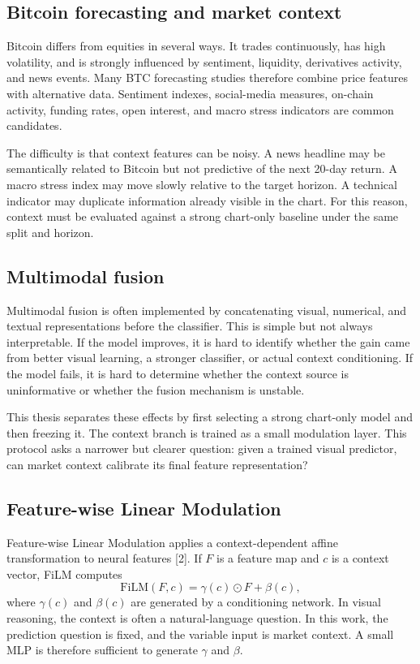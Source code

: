 \documentclass[14pt,a4paper]{extarticle}
\begin{document}
\subsection{Bitcoin forecasting and market context}

Bitcoin differs from equities in several ways. It trades continuously, has high volatility, and is strongly influenced by sentiment, liquidity, derivatives activity, and news events. Many BTC forecasting studies therefore combine price features with alternative data. Sentiment indexes, social-media measures, on-chain activity, funding rates, open interest, and macro stress indicators are common candidates.

The difficulty is that context features can be noisy. A news headline may be semantically related to Bitcoin but not predictive of the next 20-day return. A macro stress index may move slowly relative to the target horizon. A technical indicator may duplicate information already visible in the chart. For this reason, context must be evaluated against a strong chart-only baseline under the same split and horizon.

\subsection{Multimodal fusion}

Multimodal fusion is often implemented by concatenating visual, numerical, and textual representations before the classifier. This is simple but not always interpretable. If the model improves, it is hard to identify whether the gain came from better visual learning, a stronger classifier, or actual context conditioning. If the model fails, it is hard to determine whether the context source is uninformative or whether the fusion mechanism is unstable.

This thesis separates these effects by first selecting a strong chart-only model and then freezing it. The context branch is trained as a small modulation layer. This protocol asks a narrower but clearer question: given a trained visual predictor, can market context calibrate its final feature representation?

\subsection{Feature-wise Linear Modulation}

Feature-wise Linear Modulation applies a context-dependent affine transformation to neural features [2]. If $F$ is a feature map and $c$ is a context vector, FiLM computes
\begin{equation}
\mathrm{FiLM}(F,c)=\gamma(c)\odot F+\beta(c),
\end{equation}
where $\gamma(c)$ and $\beta(c)$ are generated by a conditioning network. In visual reasoning, the context is often a natural-language question. In this work, the prediction question is fixed, and the variable input is market context. A small MLP is therefore sufficient to generate $\gamma$ and $\beta$.
\end{document}
